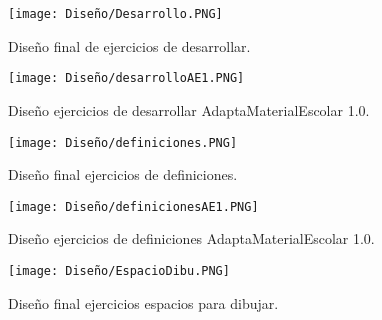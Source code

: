 \begin{figure}[ht!]
  \centering
  \texttt{[image: Diseño/Desarrollo.PNG]}
  \caption{Diseño final de ejercicios de desarrollar.}
  \label{Desarrollo}
\end{figure}

\begin{figure}[ht!]
  \centering
  \texttt{[image: Diseño/desarrolloAE1.PNG]}
  \caption{Diseño ejercicios de desarrollar AdaptaMaterialEscolar 1.0.}
  \label{desAE1}
\end{figure}

\begin{figure}[ht!]
  \centering
  \texttt{[image: Diseño/definiciones.PNG]}
  \caption{Diseño final ejercicios de definiciones.}
  \label{defi}
\end{figure}

\begin{figure}[ht!]
  \centering
  \texttt{[image: Diseño/definicionesAE1.PNG]}
  \caption{Diseño ejercicios de definiciones AdaptaMaterialEscolar 1.0.}
  \label{defiAE1}
\end{figure}

\begin{figure}[ht!]
  \centering
  \texttt{[image: Diseño/EspacioDibu.PNG]}
  \caption{Diseño final ejercicios espacios para dibujar.}
  \label{espaciosDibu}
\end{figure}








